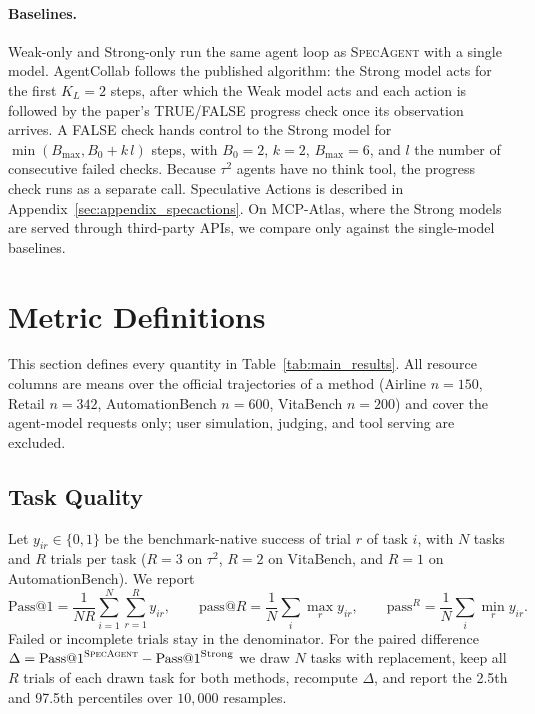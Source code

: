 \documentclass[11pt, copyright, logo, secondlogo]{template/lark}
\newcommand{\SpecAgent}{\textsc{SpecAgent}\xspace}
\begin{document}
\paragraph{Baselines.}
Weak-only and Strong-only run the same agent loop as \SpecAgent{} with a
single model. AgentCollab \citep{gao2026agentcollab} follows the published
algorithm: the Strong model acts for the first $K_L=2$ steps, after which the
Weak model acts and each action is followed by the paper's TRUE/FALSE progress
check once its observation arrives. A FALSE check hands control to the Strong
model for $\min(B_{\max},B_0+k\,l)$ steps, with $B_0=2$, $k=2$, $B_{\max}=6$,
and $l$ the number of consecutive failed checks. Because $\tau^2$ agents have
no think tool, the progress check runs as a separate call.
Speculative Actions is described in Appendix~\ref{sec:appendix_specactions}. On MCP-Atlas, where the Strong models are served through third-party APIs, we compare only against the single-model baselines.

\section{Metric Definitions}
\label{sec:appendix}

This section defines every quantity in Table~\ref{tab:main_results}. All
resource columns are means over the official trajectories of a method
(Airline $n=150$, Retail $n=342$, AutomationBench $n=600$, VitaBench $n=200$) and cover the
agent-model requests only; user simulation, judging, and tool serving are
excluded.

\subsection{Task Quality}
\label{sec:appendix_quality}

Let $y_{ir}\in\{0,1\}$ be the benchmark-native success of trial $r$ of task
$i$, with $N$ tasks and $R$ trials per task ($R=3$ on $\tau^2$, $R=2$ on
VitaBench, and $R=1$ on AutomationBench). We report
\begin{equation}
\mathrm{Pass@1}=\frac{1}{NR}\sum_{i=1}^{N}\sum_{r=1}^{R}y_{ir},\qquad
\mathrm{pass@}R=\frac{1}{N}\sum_{i}\max_{r}y_{ir},\qquad
\mathrm{pass}^{R}=\frac{1}{N}\sum_{i}\min_{r}y_{ir}.
\label{eq:pass}
\end{equation}
Failed or incomplete trials stay in the denominator. For the paired
difference $\Delta=\mathrm{Pass@1}^{\SpecAgent}-\mathrm{Pass@1}^{\mathrm{Strong}}$
we draw $N$ tasks with replacement, keep all $R$ trials of each drawn task for
both methods, recompute $\Delta$, and report the 2.5th and 97.5th percentiles
over $10{,}000$ resamples.
\end{document}
